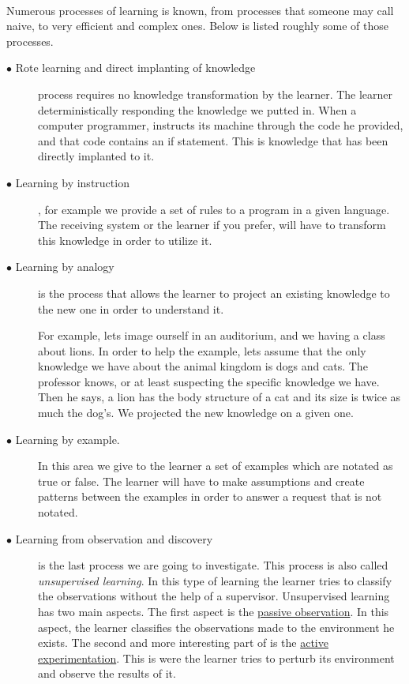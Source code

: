 \paragraph{} Numerous processes of learning is known, from processes that someone may call naive, to very efficient and complex ones. Below is listed roughly some of those processes.

\begin{description}
	\item[$\bullet$ Rote learning and direct implanting of knowledge] process requires no knowledge transformation by the learner. The learner deterministically responding the knowledge we putted in. When a computer programmer, instructs its machine through the code he provided, and that code contains an if statement. This is knowledge that has been directly implanted to it.
	\item[$\bullet$ Learning by instruction], for example we provide a set of rules to a program in a given language. The receiving system or the learner if you prefer, will have to transform this knowledge in order to utilize it.
	\item[$\bullet$ Learning by analogy] is the process that allows the learner to project an existing knowledge to the new one in order to understand it.
	
	
	For example, lets image ourself in an auditorium, and we having a class about lions. In order to help the example, lets assume that the only knowledge we have about the animal kingdom is dogs and cats. The professor knows, or at least suspecting the specific knowledge we have. Then he says, a lion has the body structure of a cat and its size is twice as much the dog's. We projected the new knowledge on a given one.
	
	\item[$\bullet$ Learning by example.] In this area we give to the learner a set of examples which are notated as true or false. The learner will have to make assumptions and create patterns between the examples in order to answer a request that is not notated.
	
	\item[$\bullet$ Learning from observation and discovery] is the last process we are going to investigate. This process is also called \textit{unsupervised learning}.
	In this type of learning the learner tries to classify the observations without the help of a supervisor. Unsupervised learning has two main aspects. The first aspect is the \underline{passive observation}. In this aspect, the learner classifies the observations made to the environment he exists. The second and more interesting part of is the \underline{active experimentation}. This is were the learner tries to perturb its environment and observe the results of it. 
	

\end{description}
